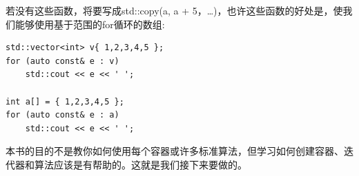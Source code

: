 若没有这些函数，将要写成std::copy(a, a + 5，…)，也许这些函数的好处是，使我们能够使用基于范围的for循环的数组:

\begin{lstlisting}[style=styleCXX]
std::vector<int> v{ 1,2,3,4,5 };
for (auto const& e : v)
	std::cout << e << ' ';

int a[] = { 1,2,3,4,5 };
for (auto const& e : a)
	std::cout << e << ' ';
\end{lstlisting}

本书的目的不是教你如何使用每个容器或许多标准算法，但学习如何创建容器、迭代器和算法应该是有帮助的。这就是我们接下来要做的。





















